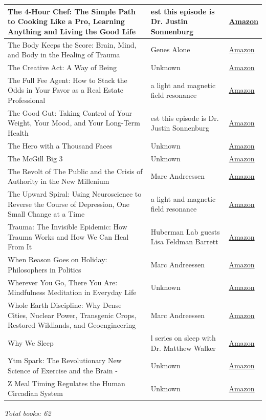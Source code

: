 \documentclass{article}
\begin{document}
\begin{longtable}{|p{8cm}|p{4cm}|p{2.5cm}|}
\hline
The 4-Hour Chef: The Simple Path to Cooking Like a Pro, Learning Anything and Living the Good Life & est this episode is Dr. Justin Sonnenburg & \href{https://amzn.to/3hqxkP0}{Amazon} \\
\hline
The Body Keeps the Score: Brain, Mind, and Body in the Healing of Trauma & Genes Alone & \href{https://amzn.to/3rUQyVO}{Amazon} \\
\hline
The Creative Act: A Way of Being & Unknown & \href{https://amzn.to/48qgkAA}{Amazon} \\
\hline
The Full Fee Agent: How to Stack the Odds in Your Favor as a Real Estate Professional & a light and magnetic field resonance & \href{https://amzn.to/3Nhe9Hp}{Amazon} \\
\hline
The Good Gut: Taking Control of Your Weight, Your Mood, and Your Long-Term Health & est this episode is Dr. Justin Sonnenburg & \href{https://amzn.to/35RQP0c}{Amazon} \\
\hline
The Hero with a Thousand Faces & Unknown & \href{https://amzn.to/4cGSDHr}{Amazon} \\
\hline
The McGill Big 3 & Unknown & \href{https://amzn.to/3JBDNV4}{Amazon} \\
\hline
The Revolt of The Public and the Crisis of Authority in the New Millenium & Marc Andreessen & \href{https://amzn.to/45BqNYW}{Amazon} \\
\hline
The Upward Spiral: Using Neuroscience to Reverse the Course of Depression, One Small Change at a Time & a light and magnetic field resonance & \href{https://amzn.to/4acfs4t}{Amazon} \\
\hline
Trauma: The Invisible Epidemic: How Trauma Works and How We Can Heal From It & Huberman Lab guests Lisa Feldman Barrett & \href{https://amzn.to/3GVLHXw}{Amazon} \\
\hline
When Reason Goes on Holiday: Philosophers in Politics & Marc Andreessen & \href{https://amzn.to/45Xpt2i}{Amazon} \\
\hline
Wherever You Go, There You Are: Mindfulness Meditation in Everyday Life & Unknown & \href{https://amzn.to/3tus7PK}{Amazon} \\
\hline
Whole Earth Discipline: Why Dense Cities, Nuclear Power, Transgenic Crops, Restored Wildlands, and Geoengineering & Marc Andreessen & \href{https://amzn.to/3sAkQNr}{Amazon} \\
\hline
Why We Sleep & l series on sleep with Dr. Matthew Walker & \href{https://amzn.to/4a9Tyyl}{Amazon} \\
\hline
Ytm
Spark: The Revolutionary New Science of Exercise and the Brain - & Unknown & \href{https://amzn.to/3AZFUgx}{Amazon} \\
\hline
Z
Meal Timing Regulates the Human Circadian System & Unknown & \href{https://amzn.to/3zEvF0P}{Amazon} \\
\hline
\end{longtable}

\textit{Total books: 62}
\end{document}
